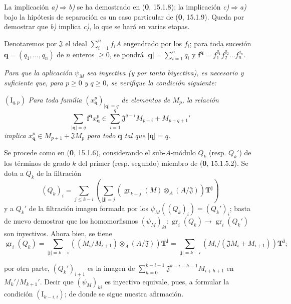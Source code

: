 La implicación \emph{a)}$\Rightarrow$\emph{b)} se ha demostrado en (\textbf{0}, 15.1.8); la implicación \emph{c)}$\Rightarrow$\emph{a)} bajo la hipótesis de separación es un caso particular de (\textbf{0}, 15.1.9). Queda por demostrar que \emph{b)} implica \emph{c)}, lo que se hará en varias etapas.

Denotaremos por $\mathfrak J$ el ideal $\sum_{i=1}^n f_iA$ engendrado por los $f_i$; para toda sucesión $\mathbf q=(q_1,\ldots,q_n)$ de $n$ enteros $\geq0$, se pondrá $|\mathbf q|=\sum_{i=1}^nq_i$ y $\mathbf f^{\mathbf q}=f_1^{q_1}f_2^{q_2}\ldots f_n^{q_n}$.

\begin{env}[19.5.5.1]
\label{IV.19.5.5.1}
\emph{Para que la aplicación $\psi_M$ sea inyectiva (y por tanto biyectiva), es necesario y suficiente que, para $p\geq0$ y $q\geq0$, se verifique la condición siguiente:}

$(\mathrm I_{q,p})$ \emph{Para toda familia $(x_{\mathbf q}^p)_{|\mathbf q|=q}$ de elementos de $M_p$, la relación}
\[
  \sum_{|\mathbf q|=q}\mathbf f^{\mathbf q}x_{\mathbf q}^p\in\sum_{i=1}^q\mathfrak J^{q-i}M_{p+i}+M_{p+q+1}'
\]
\emph{implica $x_{\mathbf q}^p\in M_{p+1}+\mathfrak JM_p$ para todo $\mathbf q$ tal que $|\mathbf q|=q$.}

Se procede como en (\textbf{0}, 15.1.6), considerando el sub-$A$-módulo $Q_k$ (resp. $Q_k'$) de los términos de grado $k$ del primer (resp. segundo) miembro de (\textbf{0}, 15.1.5.2). Se dota a $Q_k$ de la filtración
\[
  (Q_k)_i=\sum_{j\leq k-i}\left(\sum_{|\mathbf j|=j}(\operatorname{gr}_{k-j}(M)\otimes_A(A/\mathfrak J))\mathbf T^{\mathbf j}\right)
\]
y a $Q_k'$ de la filtración imagen formada por los $\psi_M((Q_k)_i)=(Q_k')_i$; basta de nuevo demostrar que los homomorfismos $(\psi_M)_{ki}:\operatorname{gr}_i(Q_k)\to\operatorname{gr}_i(Q_k')$ son inyectivos. Ahora bien, se tiene
\[
  \operatorname{gr}_i(Q_k)=\sum_{|\mathbf j|=k-i}((M_i/M_{i+1})\otimes_A(A/\mathfrak J))\mathbf T^{\mathbf j}
  =\sum_{|\mathbf j|=k-i}(M_i/(\mathfrak JM_i+M_{i+1}))\mathbf T^{\mathbf j};
\]



por otra parte, $(Q_k')_{i+1}$ es la imagen de $\sum_{h=0}^{k-i-1}\mathfrak J^{k-i-h-1}M_{i+h+1}$ en $M_k'/M_{k+1}'$. Decir que $(\psi_M)_{ki}$ es inyectivo equivale, pues, a formular la condición $(\mathrm I_{k-i,i})$; de donde se sigue nuestra afirmación.
\end{env}

